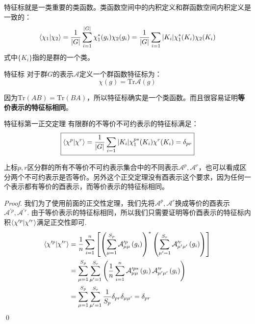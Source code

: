 特征标就是一类重要的类函数。类函数空间中的内积定义和群函数空间内积定义是一致的：
\begin{equation}
	\braket{\chi_1|\chi_2}=\frac{1}{|G|}\sum_{i=1}^{|G|}\chi_1^*(g_i)\chi_2(g_i)=\frac{1}{|G|}\sum_{i=1}|K_i|\chi_1^*(K_i)\chi_2(K_i)
\end{equation}
式中$\{K_i\}$指的是群的一个类。
\begin{define}{特征标}
	对于群$G$的表示$\mathcal{A}$定义一个群函数特征标为：
	\begin{equation}
		\chi(g)=\mathrm{Tr}\mathscr{A}(g)
	\end{equation}
\end{define}
因为$\mathrm{Tr}(AB)=\mathrm{Tr}(BA)$，所以特征标确实是一个类函数。而且很容易证明\textbf{等价表示的特征标相同}。
\begin{theorem}{特征标第一正交定理}
	有限群的不等价不可约表示的特征标满足：
	\begin{equation}
		\boxed{
			\braket{\chi^p|\chi^r}=\frac{1}{|G|}\sum_{i=1}|K_i|\chi_1^{p*}(K_i)\chi^r(K_i)=\delta_{pr}
		}
	\end{equation}

\setlength\parindent{2em}上标$p,r$区分群的所有不等价不可约表示集合中的不同表示$\mathscr{A}^p,\mathscr{A}^r$，也可以看成区分两个不可约表示是否等价。另外这个正交定理没有酉表示这个要求，因为任何一个表示都有等价的酉表示，而等价表示的特征标相同。
\end{theorem}
\begin{proof}
	我们为了使用前面的正交性定理，我们先将$\mathscr{A}^p,\mathscr{A}^r$换成等价的酉表示$\mathscr{A}^{\prime p},\mathscr{A}^{\prime r}$. 由于等价表示的特征标相同，所以我们只需要证明等价酉表示的特征标内积$\braket{\chi^{\prime p}|\chi^{\prime r}}$满足正交性即可.
	\begin{align*}
		\braket{\chi^{\prime p}|\chi^{\prime r}}& =\frac{1}{n} \sum_{i=1}^{n}\left[\left(\sum_{\mu=1}^{S_{p}} \mathcal{A}_{\mu \mu}^{\prime p}\left(g_{i}\right)\right)^{*}\left(\sum_{\mu^{\prime}=1}^{S_{r}} \mathcal{A}_{\mu^{\prime} \mu^{\prime}}^{\prime r}\left(g_{i}\right)\right)\right] \\
		& =\sum_{\mu=1}^{S_{p}} \sum_{\mu^{\prime}=1}^{S_{r}}\left(\frac{1}{n} \sum_{i=1}^{n}\mathcal{A}_{\mu \mu}^{\prime p *}\left(g_{i}\right) \mathcal{A}_{\mu^{\prime} \mu^{\prime}}^{\prime r}\left(g_{i}\right)\right) \\
		& =\sum_{\mu=1}^{S_{p}} \sum_{\mu^{\prime}=1}^{S_{r}} \frac{1}{S_{p}} \delta_{p r} \delta_{\mu \mu^{\prime}}=\delta_{p r}
	\end{align*}\qed
\end{proof}

